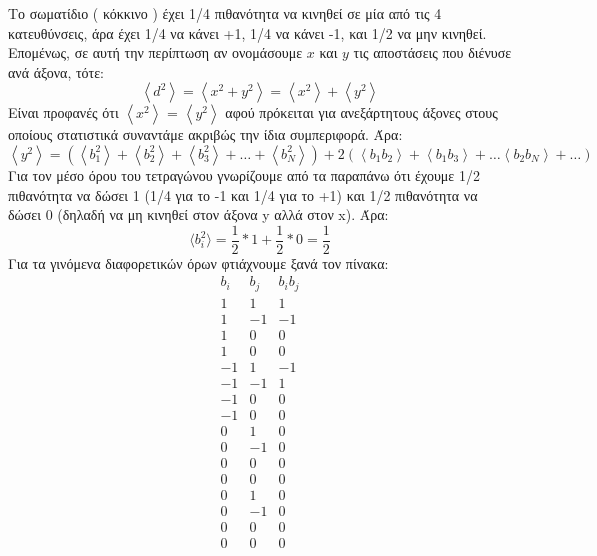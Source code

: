 Το σωματίδιο ( κόκκινο ) έχει 1/4 πιθανότητα να κινηθεί σε μία από τις 4 κατευθύνσεις, άρα έχει 1/4 να κάνει +1, 1/4 να κάνει -1, και 1/2 να μην κινηθεί. Επομένως, σε αυτή την περίπτωση αν ονομάσουμε $x$ και $y$ τις αποστάσεις που διένυσε ανά άξονα, τότε:  
\begin{equation}
\left\langle d^{2}\right\rangle=
\left\langle x^{2} + y^{2} \right\rangle
=\left\langle x^{2}\right\rangle + \left\langle y^{2}\right\rangle
\label{distanced}
\end{equation}
Είναι προφανές ότι $\left\langle x^{2}\right\rangle$ = $\left\langle y^{2}\right\rangle$ αφού πρόκειται για ανεξάρτητους άξονες στους οποίους στατιστικά συναντάμε ακριβώς την ίδια συμπεριφορά. 
Άρα: 
\begin{equation}
\left\langle y^{2}\right\rangle=\left(\left\langle b_{1}^{2}\right\rangle+\left\langle b_{2}^{2}\right\rangle+\left\langle b_{3}^{2}\right\rangle+\ldots+\left\langle b_{N}^{2}\right\rangle\right)+2\left(\left\langle b_{1} b_{2}\right\rangle+\left\langle b_{1} b_{3}\right\rangle+\ldots\left\langle b_{2} b_{N}\right\rangle+\ldots\right) 
\label{eqy}
\end{equation}
Για τον μέσο όρου του τετραγώνου γνωρίζουμε από τα παραπάνω ότι έχουμε 1/2 πιθανότητα να δώσει 1 (1/4 για το -1 και 1/4 για το +1) και 1/2 πιθανότητα να δώσει 0 (δηλαδή να μη κινηθεί στον άξονα y αλλά στον x). Άρα:
\begin{equation}
\langle b_{i}^2 \rangle=\frac{1}{2}* 1+\frac{1}{2}* 0=\frac{1}{2}
\end{equation}
Για τα γινόμενα διαφορετικών όρων φτιάχνουμε ξανά τον πίνακα:
\begin{equation}
\begin{array}{rcc}
b_{i} & b_{j} & b_{i} b_{j} \\
1 & 1 & 1 \\
1 & -1 & -1 \\
1 & 0 & 0 \\
1 & 0 & 0 \\
-1 & 1 & -1 \\
-1 & -1 & 1 \\
-1 & 0 & 0 \\
-1 & 0 & 0 \\
0 & 1 & 0 \\
0 & -1 & 0 \\
0 & 0 & 0 \\
0 & 0 & 0 \\
0 & 1 & 0 \\
0 & -1 & 0 \\
0 & 0 & 0 \\
0 & 0 & 0 
\end{array}
\end{equation}
